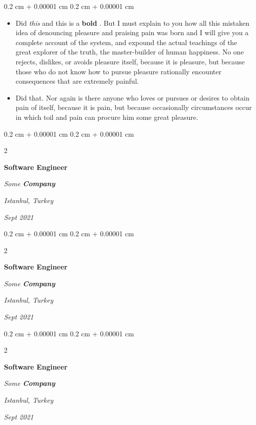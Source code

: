 \documentclass[10pt, letterpaper]{article}
\newenvironment{highlights}{
    \begin{itemize}[
        topsep=0.10 cm,
        parsep=0.10 cm,
        partopsep=0pt,
        itemsep=0pt,
        leftmargin=0.4 cm + 10pt
    ]
}{
    \end{itemize}
} %
\newenvironment{onecolentry}{
    \begin{adjustwidth}{
        0.2 cm + 0.00001 cm
    }{
        0.2 cm + 0.00001 cm
    }
}{
    \end{adjustwidth}
} %
\newenvironment{twocolentry}[2][]{
    \onecolentry
    \def\secondColumn{#2}
    \setcolumnwidth{\fill, 4.5 cm}
    \begin{paracol}{2}
}{
    \switchcolumn \raggedleft \secondColumn
    \end{paracol}
    \endonecolentry
} %
\let\hrefWithoutArrow\href
\renewcommand{\href}[2]{\hrefWithoutArrow{#1}{\ifthenelse{\equal{#2}{}}{ }{#2 }\raisebox{.15ex}{\footnotesize \faExternalLink*}}}
\begin{document}
        \vspace{0.10 cm}
        \begin{onecolentry}
            \begin{highlights}
                \item Did \textit{this} and this is a \textbf{bold} \href{https://example.com}{link}. But I must explain to you how all this mistaken idea of denouncing pleasure and praising pain was born and I will give you a complete account of the system, and expound the actual teachings of the great explorer of the truth, the master-builder of human happiness. No one rejects, dislikes, or avoids pleasure itself, because it is pleasure, but because those who do not know how to pursue pleasure rationally encounter consequences that are extremely painful.
                \item Did that. Nor again is there anyone who loves or pursues or desires to obtain pain of itself, because it is pain, but because occasionally circumstances occur in which toil and pain can procure him some great pleasure.
            \end{highlights}
        \end{onecolentry}


        \vspace{0.2 cm}

            \begin{twocolentry}{
        \textit{Istanbul, Turkey}

        \textit{Sept 2021}    }
                \textbf{Software Engineer}

                \textit{Some \textbf{Company}}
            \end{twocolentry}



        \vspace{0.2 cm}

            \begin{twocolentry}{
        \textit{Istanbul, Turkey}

        \textit{Sept 2021}    }
                \textbf{Software Engineer}

                \textit{Some \textbf{Company}}
            \end{twocolentry}



        \vspace{0.2 cm}

            \begin{twocolentry}{
        \textit{Istanbul, Turkey}

        \textit{Sept 2021}    }
                \textbf{Software Engineer}

                \textit{Some \textbf{Company}}
            \end{twocolentry}
\end{document}

